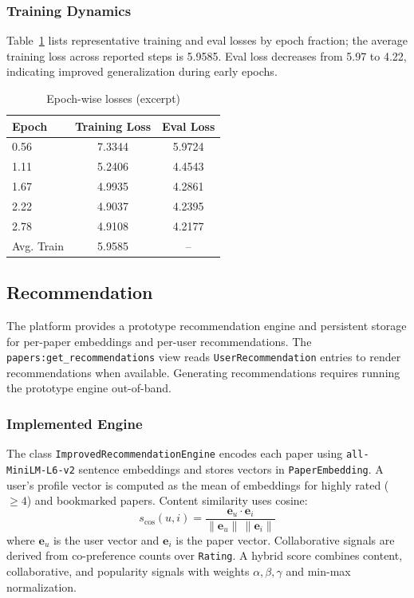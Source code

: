 \documentclass[conference]{IEEEtran}
\begin{document}
\subsubsection{Training Dynamics}
Table~\ref{tab:loss} lists representative training and eval losses by epoch fraction; the average training loss across reported steps is 5.9585. Eval loss decreases from 5.97 to 4.22, indicating improved generalization during early epochs.

\begin{table}[t]
\centering
\caption{Epoch-wise losses (excerpt)}
\begin{tabular}{lcc}
\toprule
Epoch & Training Loss & Eval Loss \\
\midrule
0.56 & 7.3344 & 5.9724 \\
1.11 & 5.2406 & 4.4543 \\
1.67 & 4.9935 & 4.2861 \\
2.22 & 4.9037 & 4.2395 \\
2.78 & 4.9108 & 4.2177 \\
\midrule
Avg. Train & 5.9585 & -- \\
\bottomrule
\end{tabular}
\label{tab:loss}
\end{table}

\subsection{Recommendation}
The platform provides a prototype recommendation engine and persistent storage for per-paper embeddings and per-user recommendations. The \texttt{papers:get\_recommendations} view reads \texttt{UserRecommendation} entries to render recommendations when available. Generating recommendations requires running the prototype engine out-of-band.

\subsubsection{Implemented Engine}
The class \texttt{ImprovedRecommendationEngine} encodes each paper using \texttt{all-MiniLM-L6-v2} sentence embeddings and stores vectors in \texttt{PaperEmbedding}. A user's profile vector is computed as the mean of embeddings for highly rated (\(\ge 4\)) and bookmarked papers. Content similarity uses cosine:
\[ s_{\mathrm{cos}}(u, i) = \frac{\mathbf{e}_u \cdot \mathbf{e}_i}{\lVert \mathbf{e}_u \rVert \, \lVert \mathbf{e}_i \rVert} \]
where \(\mathbf{e}_u\) is the user vector and \(\mathbf{e}_i\) is the paper vector. Collaborative signals are derived from co-preference counts over \texttt{Rating}. A hybrid score combines content, collaborative, and popularity signals with weights \(\alpha, \beta, \gamma\) and min-max normalization.
\end{document}
